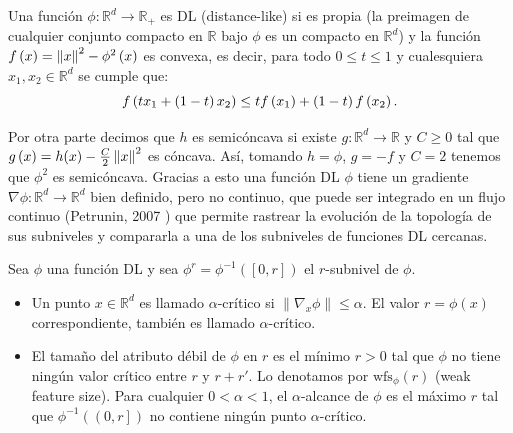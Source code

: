 \begin{definicion}
    Una funci\'on $\phi:\mathbb{R}^{d}\rightarrow\mathbb{R}_{+}$ es DL (distance-like) si es propia (la
    preimagen de cualquier conjunto compacto en $\mathbb{R}$ bajo $\phi$ es un compacto en
    $\mathbb{R}^{d}$) y la funci\'on $f\left(x\right) = \left\|x\right\|^{2}-\phi^{2}\left(x\right)$ es convexa,
    es decir, para todo $0\leq t \leq 1$ y cualesquiera $x_{1}, x_{2}\in\mathbb{R}^{d}$ se cumple que:
    \begin{equation*}
        f\left(t x_{1} + \left(1-t\right)x_{2}\right) \leq t f\left(x_{1}\right) + \left(1-t\right)f\left(x_{2}\right).
    \end{equation*}
\end{definicion}
 
Por otra parte decimos que $h$ es semic\'oncava si existe $g: \mathbb{R}^{d} \rightarrow \mathbb{R}$
y $C\geq0$ tal que $g\left(x\right) = h(x) - \frac{C}{2}\left\|x\right\|^{2}$ es c\'oncava.
As\'i, tomando $h = \phi$, $g = -f$ y $C = 2$ tenemos que $\phi^{2}$ es semic\'oncava.
Gracias a esto una funci\'on DL $\phi$ tiene un gradiente
$\nabla\phi:\mathbb{R}^{d}\rightarrow\mathbb{R}^{d}$ bien definido, pero no continuo, que puede ser
integrado en un flujo continuo (Petrunin, 2007 \cite{Petrunin2007}) que permite rastrear la evoluci\'on
de la topolog\'ia de sus subniveles y compararla a una de los subniveles de funciones DL cercanas.
 
\begin{definicion}
    Sea $\phi$ una funci\'on DL y sea $\phi^{r}=\phi^{-1}\left(\left[0,r\right]\right)$ el $r$-subnivel
    de $\phi$.
    
    \begin{itemize}
        \item Un punto $x\in\mathbb{R}^{d}$ es llamado $\alpha$-cr\'itico si
        $\left\|\nabla_{x}\phi\right\|\leq\alpha$. El valor $r=\phi\left(x\right)$ correspondiente,
        tambi\'en es llamado $\alpha$-cr\'itico.
        
        \item El tama\~{n}o del atributo d\'ebil de $\phi$ en $r$ es el m\'inimo $r>0$ tal que $\phi$
        no tiene ning\'un valor cr\'itico entre $r$ y $r+r'$. Lo denotamos por
        $\mathrm{wfs}_{\phi}\left(r\right)$ (weak feature size). Para cualquier $0<\alpha<1$, el 
        $\alpha$-alcance de $\phi$ es el m\'aximo $r$ tal que $\phi^{-1}\left(\left(0,r\right]\right)$
        no contiene ning\'un punto $\alpha$-cr\'itico.
        
    \end{itemize}
\end{definicion}
 
